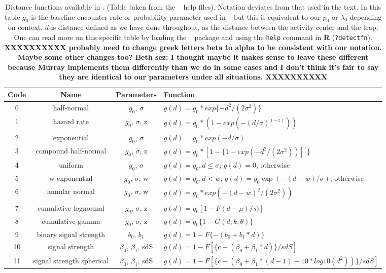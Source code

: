 \begin{table}[ht]
\centering
\caption{
  Distance functions available in \secr.  (Table taken from the \secr~
  help files). Notation deviates from that used in the text.
  In this table $g_{0}$ is the baseline encounter rate or probability
  parameter used in \secr~ but this is equivalent to our $p_{0}$ or
  $\lambda_{0}$ depending on context. $d$ is distance defined as we have done throughout,
  as the distance between the activity center and the trap.
  One can read more on this specific table by loading the \secr~ package and using the
  {\tt help} command in {\bf R} ({\tt ?detectfn}).
 {\bf XXXXXXXXXX probably need to change greek letters beta to alpha
   to be consistent with our notation. Maybe some other changes too?  
Beth sez:  I thought maybe it makes sense to leave these different because
Murray implements them differently than we do in some cases and I don't think it's fair
to say they are identical to our parameters under all situations.  XXXXXXXXXX}
}
\begin{tabular}{cccl}
\hline \hline
Code & Name & Parameters & Function  \\ \hline
0 & half-normal &$g_0$, $\sigma$          &  $g(d) = g_0 * exp\{-d^2 / (2  \sigma^2) \}$  \\
1 &hazard rate  & $g_0$, $\sigma$, z      &  $g(d) = g_0 * (1 - exp(- (d / \sigma) ^(-z) ))$ \\
2 &exponential   &$g_0$, $\sigma$    &  $g(d) = g_0 * exp(- d / \sigma)$ \\
3 &compound half-normal  & $g_0$, $\sigma$, z & $g(d) = g_0 * [1 - \{1 - exp(-d^2 / (2 \sigma^2))]^z\}$ \\
4 &uniform     & $g_0$, $\sigma$     &
\parbox[t]{2in}{ $g(d) = g_{0}, d \leq \sigma$; \\
                 $g(d)= 0$, otherwise
} \\
5 &w exponential            & $g_0$, $\sigma$, w &
\parbox[t]{2in}{ $g(d) = g_{0}, d < w$; \\
                 $g(d) = g_{0} \exp(- (d - w) / \sigma)$, otherwise
} \\
6 &annular normal           & $g_0$, $\sigma$, w & $g(d) = g_0 * exp(-(d-w)^2 / (2 \sigma^2))$ \\
7 &cumulative lognormal     & $g_0$, $\sigma$, z & $g(d) = g_0 [1 -F{(d-\mu)/s)}]$  \\
8 &cumulative gamma         & $g_0$, $\sigma$, z  & $g(d) = g_0 \{ 1 - G (d; k,  \theta) \}$  \\
9 &binary signal strength   & $b_0$, $b_1$       & $g(d) = 1 - F \{- (b_0 + b_1 * d) \}$ \\
10&signal strength          & $\beta_0$, $\beta_1$, sdS  &
  $g(d) = 1 - F[ \{c - (\beta_0 + \beta_1 * d)\} / sdS]$  \\
11&signal strength spherical&  $\beta_0$, $\beta_1$, sdS & 
\parbox[t]{2in}{ $g(d) = 1 - F[\{c - (\beta_0 + \beta_1 * (d-1)- 10 * log10 ( d^2 ) ) \} / sdS ]$ 
} \\


\end{tabular}
\end{table}
